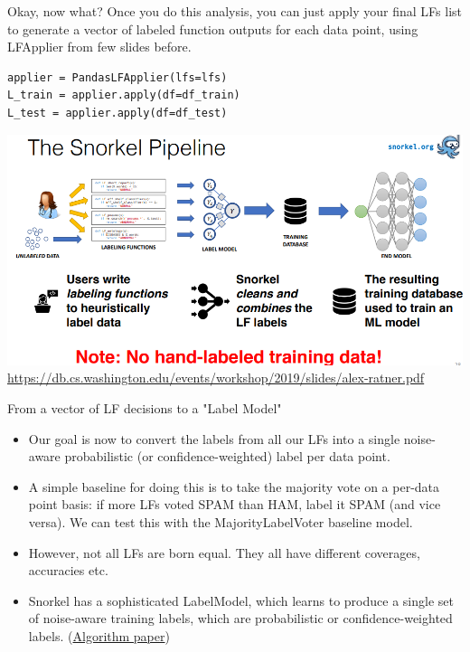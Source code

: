 \documentclass{beamer}
\begin{document}
\begin{frame}[fragile]{Okay, now what?}
Once you do this analysis, you can just apply your final LFs list to generate a vector of labeled function outputs for each data point, using LFApplier from few slides before.
\small
\begin{verbatim}
applier = PandasLFApplier(lfs=lfs)
L_train = applier.apply(df=df_train)
L_test = applier.apply(df=df_test)
\end{verbatim}
\end{frame}

\begin{frame}{}
    \includegraphics[width=\textwidth]{figures/snorkelradiologyexample.PNG}
    \href{Source}{https://db.cs.washington.edu/events/workshop/2019/slides/alex-ratner.pdf}
\end{frame}

\begin{frame}{From a vector of LF decisions to a "Label Model"}
    \begin{itemize}
        \item Our goal is now to convert the labels from all our LFs into a single noise-aware probabilistic (or confidence-weighted) label per data point. \pause
        \item A simple baseline for doing this is to take the majority vote on a per-data point basis: if more LFs voted SPAM than HAM, label it SPAM (and vice versa). We can test this with the MajorityLabelVoter baseline model. \pause
        \item However, not all LFs are born equal. They all have different coverages, accuracies etc. 
        \item Snorkel has a sophisticated LabelModel, which learns to produce a single set of noise-aware training labels, which are probabilistic or confidence-weighted labels. (\href{https://arxiv.org/abs/1810.02840}{Algorithm paper})
    \end{itemize}
\end{frame}
\end{document}
